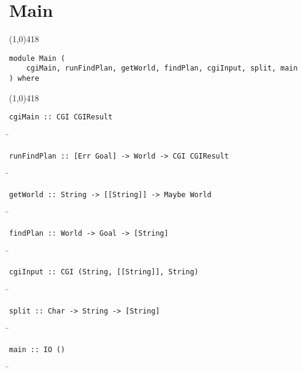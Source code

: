 \section{Main}
\begin{center}
\line(1,0){418}
\end{center}
\begin{verbatim}
module Main (
    cgiMain, runFindPlan, getWorld, findPlan, cgiInput, split, main
) where
\end{verbatim}
\begin{center}
\line(1,0){418}
\end{center}
\begin{verbatim}
cgiMain :: CGI CGIResult
\end{verbatim}
\begin{tabbing}
\hspace*{1cm}\= \kill
\> 
\end{tabbing}
\begin{verbatim}
runFindPlan :: [Err Goal] -> World -> CGI CGIResult
\end{verbatim}
\begin{tabbing}
\hspace*{1cm}\= \kill
\> 
\end{tabbing}
\begin{verbatim}
getWorld :: String -> [[String]] -> Maybe World
\end{verbatim}
\begin{tabbing}
\hspace*{1cm}\= \kill
\> 
\end{tabbing}
\begin{verbatim}
findPlan :: World -> Goal -> [String]
\end{verbatim}
\begin{tabbing}
\hspace*{1cm}\= \kill
\> 
\end{tabbing}
\begin{verbatim}
cgiInput :: CGI (String, [[String]], String)
\end{verbatim}
\begin{tabbing}
\hspace*{1cm}\= \kill
\> 
\end{tabbing}
\begin{verbatim}
split :: Char -> String -> [String]
\end{verbatim}
\begin{tabbing}
\hspace*{1cm}\= \kill
\> 
\end{tabbing}
\begin{verbatim}
main :: IO ()
\end{verbatim}
\begin{tabbing}
\hspace*{1cm}\= \kill
\> 
\end{tabbing}
